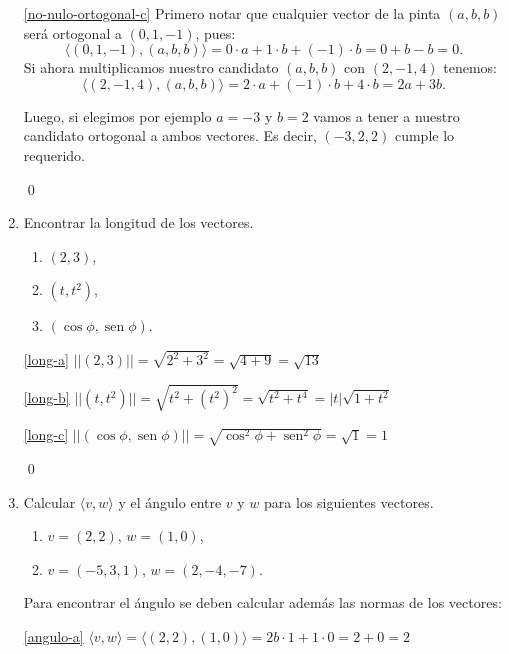 \begin{enumerate}[topsep=6pt, itemsep=.4cm]
\ref{no-nulo-ortogonal-c} Primero notar que cualquier vector de la pinta $(a,b,b)$ será ortogonal a $(0,1,-1)$, pues:
$$\langle (0,1,-1),(a,b,b)\rangle = 0 \cdot a + 1 \cdot b + (-1) \cdot b = 0 + b - b = \boxed{0}.$$
Si ahora multiplicamos nuestro candidato $(a,b,b)$ con $(2,-1,4)$ tenemos:
$$\langle (2,-1,4) , (a,b,b) \rangle = 2 \cdot a + (-1) \cdot b + 4 \cdot b = \boxed{2a + 3 b}.$$

Luego, si elegimos por ejemplo $a=-3$ y $b=2$ vamos a tener a nuestro candidato ortogonal a ambos vectores. Es decir, $(-3,2,2)$ cumple lo requerido.


\qed

\item Encontrar la longitud de los vectores.
\begin{multicols}{3}
    \begin{enumerate}
        \item\label{long-a} $(2,3)$,
        \item\label{long-b} $(t,t^2)$,
        \item\label{long-c} $(\cos\phi,\operatorname{sen}\phi)$.
    \end{enumerate}
\end{multicols}


\rta 

\ref{long-a} $||(2,3)|| = \sqrt{2^2 + 3^2} = \sqrt{4+9} = \boxed{\sqrt{13}}$

\ref{long-b} $||(t,t^2)|| = \sqrt{t^2 + (t^2)^2} = \sqrt{t^2+t^4} = \boxed{|t|\sqrt{1+t^2}}$

\ref{long-c} $||(\cos\phi,\operatorname{sen}\phi)|| = \sqrt{\cos^2\phi + \operatorname{sen}^2\phi} = \sqrt{1} = \boxed{1}$


\qed

\item Calcular $\langle v , w  \rangle$ y el ángulo entre $v$ y $w$  para los siguientes vectores.
\begin{multicols}{2}
    \begin{enumerate}
        \item\label{angulo-a} $v=(2,2)$, $w=(1,0)$,
        \item\label{angulo-b} $v=(-5,3,1)$, $w=(2,-4,-7)$.
    \end{enumerate}
\end{multicols}

\rta Para encontrar el ángulo se deben calcular además las normas de los vectores:

\ref{angulo-a} $\langle v , w  \rangle = \langle (2,2) , (1,0)  \rangle = 2b\cdot 1 + 1 \cdot 0 = 2 + 0 = \boxed{2}$


\end{enumerate}
